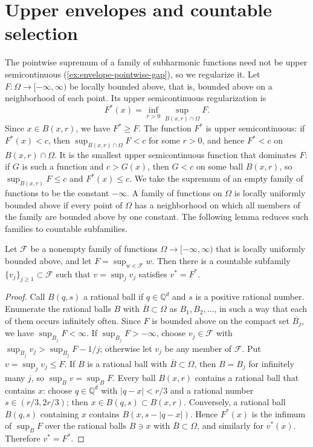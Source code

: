 \section{Upper envelopes and countable selection}
\label{sec:subharmonic-envelopes}
The pointwise supremum of a family of subharmonic functions need not be upper semicontinuous (\cref{ex:envelope-pointwise-gap}), so we regularize it. Let $F\colon\Omega\to[-\infty,\infty)$ be locally bounded above, that is, bounded above on a neighborhood of each point. Its upper semicontinuous regularization is
\[
 F^*(x)=\inf_{r>0}\sup_{B(x,r)\cap\Omega}F.
\]
Since $x\in B(x,r)$, we have $F^*\geq F$. The function $F^*$ is upper semicontinuous: if $F^*(x)<c$, then $\sup_{B(x,r)\cap\Omega}F<c$ for some $r>0$, and hence $F^*<c$ on $B(x,r)\cap\Omega$. It is the smallest upper semicontinuous function that dominates $F$: if $G$ is such a function and $c>G(x)$, then $G<c$ on some ball $B(x,r)$, so $\sup_{B(x,r)}F\leq c$ and $F^*(x)\leq c$. We take the supremum of an empty family of functions to be the constant $-\infty$. A family of functions on $\Omega$ is locally uniformly bounded above if every point of $\Omega$ has a neighborhood on which all members of the family are bounded above by one constant. The following lemma reduces such families to countable subfamilies.

\begin{lemma}\label{lem:choquet-selection}
Let $\mathcal F$ be a nonempty family of functions $\Omega\to[-\infty,\infty)$ that is locally uniformly bounded above, and let $F=\sup_{w\in\mathcal F}w$. Then there is a countable subfamily $\{v_j\}_{j\geq1}\subset\mathcal F$ such that $v=\sup_jv_j$ satisfies $v^*=F^*$.
\end{lemma}
\begin{proof}
Call $B(q,s)$ a rational ball if $q\in\mathbb Q^d$ and $s$ is a positive rational number. Enumerate the rational balls $B$ with $\overline B\subset\Omega$ as $B_1,B_2,\ldots$, in such a way that each of them occurs infinitely often. Since $F$ is bounded above on the compact set $\overline{B_j}$, we have $\sup_{B_j}F<\infty$. If $\sup_{B_j}F>-\infty$, choose $v_j\in\mathcal F$ with $\sup_{B_j}v_j>\sup_{B_j}F-1/j$; otherwise let $v_j$ be any member of $\mathcal F$. Put $v=\sup_jv_j\leq F$. If $B$ is a rational ball with $\overline B\subset\Omega$, then $B=B_j$ for infinitely many $j$, so $\sup_Bv=\sup_BF$. Every ball $B(x,r)$ contains a rational ball that contains $x$: choose $q\in\mathbb Q^d$ with $|q-x|<r/3$ and a rational number $s\in(r/3,2r/3)$; then $x\in B(q,s)\subset B(x,r)$. Conversely, a rational ball $B(q,s)$ containing $x$ contains $B(x,s-|q-x|)$. Hence $F^*(x)$ is the infimum of $\sup_BF$ over the rational balls $B\ni x$ with $\overline B\subset\Omega$, and similarly for $v^*(x)$. Therefore $v^*=F^*$.
\end{proof}

